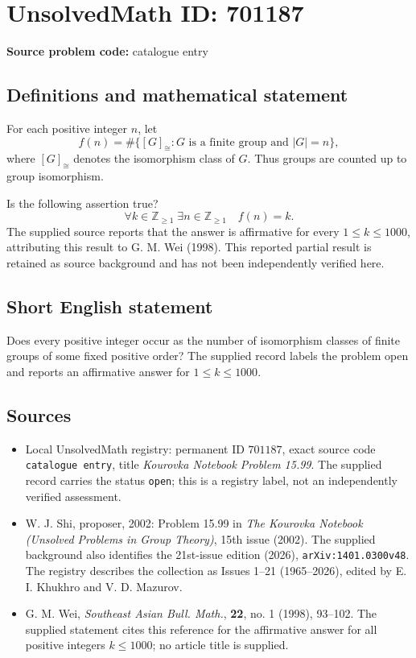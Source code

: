 \documentclass[11pt]{article}
\newcommand{\Z}{\mathbb{Z}}
\begin{document}
\section*{UnsolvedMath ID: 701187}
\textbf{Source problem code:} catalogue entry
\subsection{Definitions and mathematical statement}
For each positive integer \(n\), let
\[
f(n)=\#\bigl\{[G]_{\cong}: G\text{ is a finite group and }|G|=n\bigr\},
\]
where \([G]_{\cong}\) denotes the isomorphism class of \(G\). Thus groups are counted up to group isomorphism.

Is the following assertion true?
\[
\forall k\in\Z_{\geq 1}\;\exists n\in\Z_{\geq 1}\quad f(n)=k.
\]
The supplied source reports that the answer is affirmative for every \(1\leq k\leq 1000\), attributing this result to G. M. Wei (1998). This reported partial result is retained as source background and has not been independently verified here.
\subsection{Short English statement}
Does every positive integer occur as the number of isomorphism classes of finite groups of some fixed positive order? The supplied record labels the problem open and reports an affirmative answer for \(1\leq k\leq 1000\).
\subsection{Sources}
\begin{itemize}
\item Local UnsolvedMath registry: permanent ID \(701187\), exact source code \texttt{catalogue entry}, title \emph{Kourovka Notebook Problem 15.99}. The supplied record carries the status \texttt{open}; this is a registry label, not an independently verified assessment.
\item W. J. Shi, proposer, 2002: Problem 15.99 in \emph{The Kourovka Notebook (Unsolved Problems in Group Theory)}, 15th issue (2002). The supplied background also identifies the 21st-issue edition (2026), \texttt{arXiv:1401.0300v48}. The registry describes the collection as Issues 1--21 (1965--2026), edited by E. I. Khukhro and V. D. Mazurov.
\item G. M. Wei, \emph{Southeast Asian Bull. Math.}, \textbf{22}, no. 1 (1998), 93--102. The supplied statement cites this reference for the affirmative answer for all positive integers \(k\leq 1000\); no article title is supplied.
\end{itemize}
\end{document}

